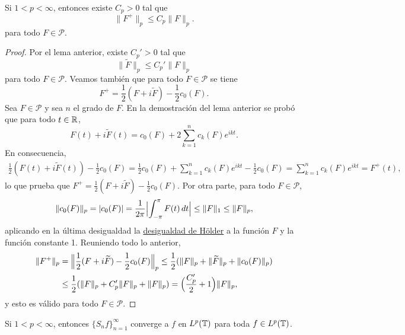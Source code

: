 \documentclass[a4paper, 12pt]{book}
\begin{document}
\begin{lemma}
    Si $1 < p < \infty$, entonces existe $C_p > 0$ tal que
    \[\|F^+\|_p \leq C_p \|F\|_{p}.\]
    para todo $F \in \mathcal{P}$.
\end{lemma}

\begin{proof}
    Por el lema anterior, existe $C_p'>0$ tal que
    \[\|\widetilde{F}\|_p\leq C_p' \|F\|_p\]
    para todo $F \in \mathcal{P}$. Veamos también que para todo $F \in \mathcal{P}$ se tiene
    \[F^+ = \frac{1}{2}(F+i\widetilde{F})-\frac{1}{2}c_0(F).\] 
    Sea $F\in\mathcal{P}$ y sea $n$ el grado de $F$. En la demostración del lema anterior se probó que para todo $t\in\mathbb R$,
    \[F(t)+i\widetilde{F}(t) = c_0(F)+2\sum_{k=1}^n c_k(F)e^{ikt}.\]
    En consecuencia,
    \begin{align*}
        \frac{1}{2}(F(t)+i\widetilde{F}(t))-\frac{1}{2}c_0(F) = \frac{1}{2}c_0(F)+\sum_{k=1}^n c_k(F)e^{ikt}-\frac{1}{2}c_0(F) = \sum_{k=1}^n c_k(F)e^{ikt} = F^+(t),
    \end{align*}
    lo que prueba que $F^+=\frac{1}{2}(F+i\widetilde{F})-\frac{1}{2}c_0(F)$. Por otra parte, para todo $F\in\mathcal{P}$,
    \[\|c_0(F)\|_p = |c_0(F)| = \frac{1}{2\pi}\Bigl|\int_{-\pi}^{\pi} F(t) \, dt\Bigr| \leq \|F\|_1\leq \|F\|_p,\]
    aplicando en la última desigualdad la \hyperref[1.1.1]{desigualdad de Hölder} a la función $F$ y la función constante 1. Reuniendo todo lo anterior,
    \begin{align*}
        \|F^+\|_p &= \Bigl\|\frac{1}{2}(F+i\widetilde{F})-\frac{1}{2}c_0(F)\Bigr\|_p \leq \frac{1}{2}(\|F\|_p+\|\widetilde{F}\|_p+\|c_0(F)\|_p) \\ 
        &\leq \frac{1}{2}(\|F\|_p+C_p'\|F\|_p+\|F\|_p) = \Bigl(\frac{C_p'}{2}+1\Bigr)\|F\|_p,
    \end{align*}
    y esto es válido para todo $F\in\mathcal{P}$.
\end{proof}

\begin{theorem}
    Si $1 < p < \infty$, entonces $\{S_nf\}_{n=1}^\infty$ converge a $f$ en $L^p(\mathbb T)$ para toda $f \in L^p(\mathbb T)$.
\end{theorem}
\end{document}

